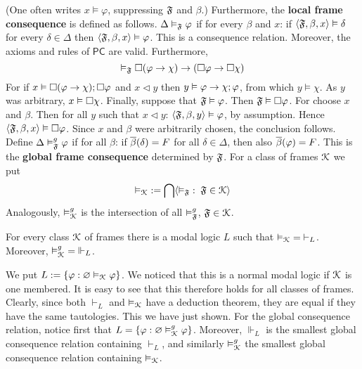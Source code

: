 (One often writes $x \vDash \varphi$, suppressing $\mathfrak{F}$ and $\beta$.)
Furthermore, the \textbf{local frame consequence} is defined as follows.
$\Delta \vDash_{\mathfrak{F}} \varphi$ if for every $\beta$ and $x$:
if $\langle \mathfrak{F}, \beta, x\rangle \vDash \delta$ for every $\delta \in
\Delta$ then $\langle \mathfrak{F}, \beta, x\rangle \vDash \varphi$. This is
a consequence relation. Moreover, the axioms and rules of $\mathsf{PC}$
are valid. Furthermore,
\begin{equation}
\vDash_{\mathfrak{F}} \square(\varphi\rightarrow\chi) \rightarrow (\square \varphi \rightarrow \square\chi)
\end{equation}
For if $x \vDash \square(\varphi\rightarrow\chi); \square\varphi$ and $x \lhd y$
then $y\vDash \varphi \rightarrow\chi;\varphi$, from which $y \vDash \chi$. 
As $y$ was arbitrary, $x \vDash \square\chi$. Finally, suppose that 
$\mathfrak{F} \vDash \varphi$. Then $\mathfrak{F} \vDash \square\varphi$.
For choose $x$ and $\beta$. Then for all $y$ such that
$x \lhd y$: $\langle \mathfrak{F}, \beta, y\rangle\vDash \varphi$, by assumption. 
Hence $\langle \mathfrak{F}, \beta, x\rangle\vDash \square\varphi$. Since $x$ and
$\beta$ were arbitrarily chosen, the conclusion follows.
Define $\Delta \vDash^g_{\mathfrak{F}} \varphi$ if for all $\beta$:
if $\overline{\beta}(\delta) = F$ for all $\delta \in \Delta$,
then also $\overline{\beta}(\varphi) = F$. This is the
\textbf{global frame consequence} determined by $\mathfrak{F}$.
For a class of frames $\mathcal{K}$ we put
\begin{equation}
\vDash_{\mathcal{K}}\; := \bigcap \langle \vDash_{\mathfrak{F}}\; : \; \mathfrak{F} \in \mathcal{K}\rangle
\end{equation}
Analogously,
$\vDash_{\mathcal{K}}^g$ is the intersection of all $\vDash^g_{\mathfrak{F}}$,
$\mathfrak{F} \in \mathcal{K}$.
\begin{thm}
For every class $\mathcal{K}$ of frames there is a modal logic $L$
such that $\vDash_{\mathcal{K}}\; = \;\vdash_{L}$. Moreover,
$\vDash_{\mathcal{K}}^g \; = \; \Vdash_{L}$.
\end{thm}
\proofbeg
We put $L := \{\varphi : \varnothing \vDash_{\mathcal{K}} \varphi\}$.
We noticed that this is a normal modal logic if $\mathcal{K}$ is one
membered. It is easy to see that this therefore holds for
all classes of frames. Clearly, since both $\vdash_{L}$
and $\vDash_{\mathcal{K}}$ have a deduction theorem, they are equal if
they have the same tautologies. This we have just shown.
For the global consequence relation, notice first that
$L = \{\varphi : \varnothing \vDash^g_{\mathcal{K}}\varphi\}$.
Moreover, $\Vdash_{L}$ is the smallest global consequence
relation containing $\vdash_{L}$, and similarly
$\vDash^g_{\mathcal{K}}$ the smallest global consequence relation
containing $\vDash_{\mathcal{K}}$.
\proofend

